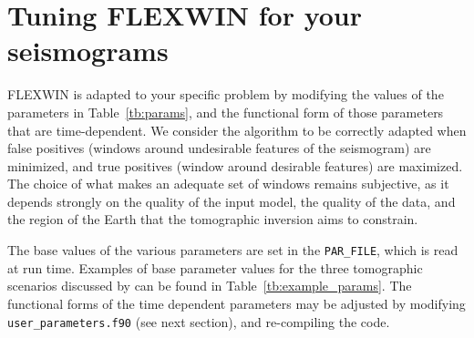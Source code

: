 \chapter{Tuning FLEXWIN for your seismograms\label{sec:tuning}}

FLEXWIN is adapted to your specific problem by modifying the values of the parameters in Table~\ref{tb:params}, and the functional form of those parameters that are time-dependent. We consider the algorithm to be correctly adapted when false positives (windows around undesirable features of the seismogram) are minimized, and true positives (window around desirable features) are maximized. The choice of what makes an adequate set of windows remains subjective, as it depends strongly on the quality of the input model, the quality of the data, and the region of the Earth that the tomographic inversion aims to constrain.  

The base values of the various parameters are set in the {\tt PAR\_FILE}, which is read at run time.  Examples of base parameter values for the three tomographic scenarios discussed by \cite{MaggiEtal2009} can be found in Table~\ref{tb:example_params}.  The functional forms of the time dependent parameters may be adjusted by modifying {\tt user\_parameters.f90} (see next section), and re-compiling the code.

